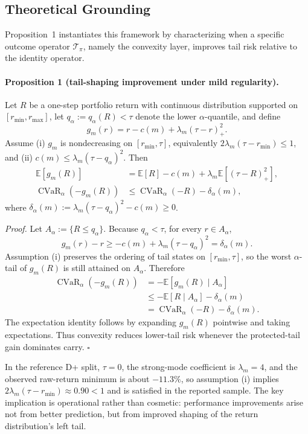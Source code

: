 \documentclass[10pt,twocolumn]{article}
\begin{document}
\subsection{Theoretical Grounding}

Proposition~1 instantiates this framework by characterizing when a specific
outcome operator $\mathcal{T}_{\pi}$, namely the convexity layer, improves
tail risk relative to the identity operator.

\paragraph{Proposition 1 (tail-shaping improvement under mild regularity).}
Let $R$ be a one-step portfolio return with continuous distribution supported on
$[r_{\min}, r_{\max}]$, let $q_\alpha:=q_\alpha(R)<\tau$ denote the lower
$\alpha$-quantile, and define
\[
g_m(r)=r-c(m)+\lambda_m(\tau-r)_+^2.
\]
Assume (i) $g_m$ is nondecreasing on $[r_{\min},\tau]$, equivalently
$2\lambda_m(\tau-r_{\min})\le 1$, and (ii)
$c(m)\le \lambda_m(\tau-q_\alpha)^2$. Then
\begin{align*}
\mathbb{E}[g_m(R)]
&=\mathbb{E}[R]-c(m)+\lambda_m \mathbb{E}\!\left[(\tau-R)_+^2\right], \\
\operatorname{CVaR}_\alpha(-g_m(R))
&\le \operatorname{CVaR}_\alpha(-R)-\delta_\alpha(m),
\end{align*}
where $\delta_\alpha(m):=\lambda_m(\tau-q_\alpha)^2-c(m)\ge 0$.

\emph{Proof.} Let $A_\alpha:=\{R\le q_\alpha\}$. Because $q_\alpha<\tau$, for
every $r\in A_\alpha$,
\[
g_m(r)-r \ge -c(m)+\lambda_m(\tau-q_\alpha)^2 = \delta_\alpha(m).
\]
Assumption (i) preserves the ordering of tail states on $[r_{\min},\tau]$, so
the worst $\alpha$-tail of $g_m(R)$ is still attained on $A_\alpha$. Therefore
\begin{align*}
\operatorname{CVaR}_\alpha(-g_m(R))
&= -\mathbb{E}[g_m(R)\mid A_\alpha] \\
&\le -\mathbb{E}[R\mid A_\alpha]-\delta_\alpha(m) \\
&= \operatorname{CVaR}_\alpha(-R)-\delta_\alpha(m).
\end{align*}
The expectation identity follows by expanding $g_m(R)$ pointwise and taking
expectations. Thus convexity reduces lower-tail risk whenever the protected-tail
gain dominates carry. \hfill $\square$

In the reference D+ split, $\tau=0$, the strong-mode coefficient is
$\lambda_m=4$, and the observed raw-return minimum is about $-11.3\%$, so
assumption (i) implies $2\lambda_m(\tau-r_{\min})\approx 0.90<1$ and is
satisfied in the reported sample. The key implication is operational rather
than cosmetic: performance improvements arise not from better prediction, but
from improved shaping of the return distribution's left tail.
\end{document}
